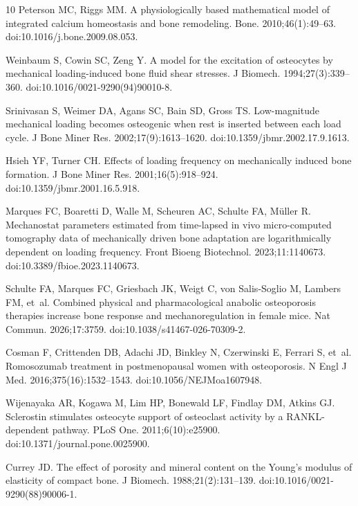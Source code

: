 \documentclass[10pt,letterpaper]{article}
\begin{document}
\begin{thebibliography}{10}
Peterson MC, Riggs MM.
\newblock A physiologically based mathematical model of integrated calcium
  homeostasis and bone remodeling.
\newblock Bone. 2010;46(1):49--63. doi:10.1016/j.bone.2009.08.053.

Weinbaum S, Cowin SC, Zeng Y.
\newblock A model for the excitation of osteocytes by mechanical
  loading-induced bone fluid shear stresses.
\newblock J Biomech. 1994;27(3):339--360. doi:10.1016/0021-9290(94)90010-8.

Srinivasan S, Weimer DA, Agans SC, Bain SD, Gross TS.
\newblock Low-magnitude mechanical loading becomes osteogenic when rest is
  inserted between each load cycle.
\newblock J Bone Miner Res. 2002;17(9):1613--1620.
  doi:10.1359/jbmr.2002.17.9.1613.

Hsieh YF, Turner CH.
\newblock Effects of loading frequency on mechanically induced bone formation.
\newblock J Bone Miner Res. 2001;16(5):918--924.
  doi:10.1359/jbmr.2001.16.5.918.

Marques FC, Boaretti D, Walle M, Scheuren AC, Schulte FA, M\"{u}ller R.
\newblock Mechanostat parameters estimated from time-lapsed in vivo
  micro-computed tomography data of mechanically driven bone adaptation are
  logarithmically dependent on loading frequency.
\newblock Front Bioeng Biotechnol. 2023;11:1140673.
  doi:10.3389/fbioe.2023.1140673.

Schulte FA, Marques FC, Griesbach JK, Weigt C, von Salis-Soglio M, Lambers FM,
  et~al.
\newblock Combined physical and pharmacological anabolic osteoporosis therapies
  increase bone response and mechanoregulation in female mice.
\newblock Nat Commun. 2026;17:3759. doi:10.1038/s41467-026-70309-2.

Cosman F, Crittenden DB, Adachi JD, Binkley N, Czerwinski E, Ferrari S, et~al.
\newblock Romosozumab treatment in postmenopausal women with osteoporosis.
\newblock N Engl J Med. 2016;375(16):1532--1543. doi:10.1056/NEJMoa1607948.

Wijenayaka AR, Kogawa M, Lim HP, Bonewald LF, Findlay DM, Atkins GJ.
\newblock Sclerostin stimulates osteocyte support of osteoclast activity by a
  RANKL-dependent pathway.
\newblock PLoS One. 2011;6(10):e25900. doi:10.1371/journal.pone.0025900.

Currey JD.
\newblock The effect of porosity and mineral content on the Young's modulus of
  elasticity of compact bone.
\newblock J Biomech. 1988;21(2):131--139. doi:10.1016/0021-9290(88)90006-1.


\end{thebibliography}
\end{document}
